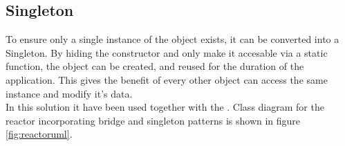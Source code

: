 \documentclass[Main]{subfiles}
\begin{document}
\subsection{Singleton}
To ensure only a single instance of the object exists, it can be converted into a Singleton.
By hiding the constructor and only make it accesable via a static function, the object can be created, and reused for the duration of the application. This gives the benefit of every other object can access the same instance and modify it's data.\\
In this solution it have been used together with the . Class diagram for the reactor incorporating bridge and singleton patterns is shown in figure \ref{fig:reactoruml}.
\end{document}
